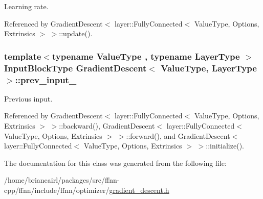 Learning rate. 



Referenced by Gradient\-Descent$<$ layer\-::\-Fully\-Connected$<$ Value\-Type, Options, Extrinsics $>$ $>$\-::update().

\hypertarget{class_gradient_descent_aaf7ea2e806c9f55fb8644667583f27ff}{
\subsubsection[{prev\-\_\-input\-\_\-}]{\setlength{\rightskip}{0pt plus 5cm}template$<$typename Value\-Type , typename Layer\-Type $>$ {\bf Input\-Block\-Type} {\bf Gradient\-Descent}$<$ Value\-Type, Layer\-Type $>$\-::prev\-\_\-input\-\_\-\hspace{0.3cm}{\ttfamily [protected]}}}\label{class_gradient_descent_aaf7ea2e806c9f55fb8644667583f27ff}


Previous input. 



Referenced by Gradient\-Descent$<$ layer\-::\-Fully\-Connected$<$ Value\-Type, Options, Extrinsics $>$ $>$\-::backward(), Gradient\-Descent$<$ layer\-::\-Fully\-Connected$<$ Value\-Type, Options, Extrinsics $>$ $>$\-::forward(), and Gradient\-Descent$<$ layer\-::\-Fully\-Connected$<$ Value\-Type, Options, Extrinsics $>$ $>$\-::initialize().



The documentation for this class was generated from the following file\-:\begin{DoxyCompactItemize}
\item 
/home/briancairl/packages/src/ffnn-\/cpp/ffnn/include/ffnn/optimizer/\hyperlink{gradient__descent_8h}{gradient\-\_\-descent.\-h}\end{DoxyCompactItemize}
